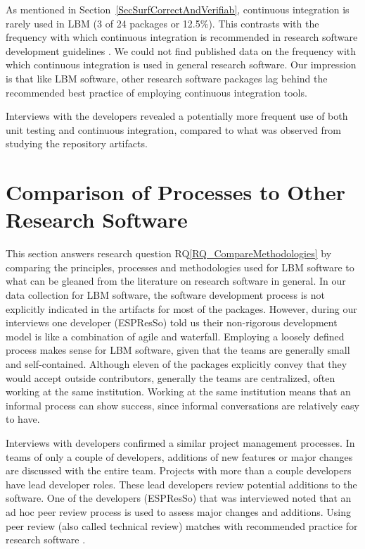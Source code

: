 \documentclass[runningheads]{llncs}
\newcommand{\rqref}[1]{RQ\ref{#1}}
\begin{document}
As mentioned in Section~\ref{SecSurfCorrectAndVerifiab}, continuous integration
is rarely used in LBM (3 of 24 packages or 12.5\%). This contrasts with the
frequency with which continuous integration is recommended in research software
development guidelines \cite{BrettEtAl2021,Brown2015,ThielEtAl2020,Zadka2018,vanGompelEtAl2016}.  We could not find published data on the
frequency with which continuous integration is used in general research
software.  Our impression is that like LBM software, other research software
packages lag behind the recommended best practice of employing continuous
integration tools.

Interviews with the developers revealed a potentially more frequent use of both
unit testing and continuous integration, compared to what was observed from
studying the repository artifacts.

\section{Comparison of Processes to Other Research Software} \label{Sec_CompareMethodologies}

This section answers research question \rqref{RQ_CompareMethodologies} by
comparing the principles, processes and methodologies used for LBM software to
what can be gleaned from the literature on research software in general. In our
data collection for LBM software, the software development process is not
explicitly indicated in the artifacts for most of the packages. However, during
our interviews one developer (ESPResSo) told us their non-rigorous development
model is like a combination of agile and waterfall. Employing a loosely defined
process makes sense for LBM software, given that the teams are generally small
and self-contained.  Although eleven of the packages explicitly convey that they
would accept outside contributors, generally the teams are centralized, often
working at the same institution.  Working at the same institution means that an
informal process can show success, since informal conversations are relatively
easy to have.

Interviews with developers confirmed a similar project management processes. In
teams of only a couple of developers, additions of new features or major changes
are discussed with the entire team. Projects with more than a couple developers
have lead developer roles. These lead developers review potential additions to
the software. One of the developers (ESPResSo) that was interviewed noted that
an ad hoc peer review process is used to assess major changes and additions.
Using peer review (also called technical review) matches with recommended
practice for research software \cite{HerouxEtAl2008,Givler2020,OrvizEtAl2017,USGS2019}.
\end{document}
